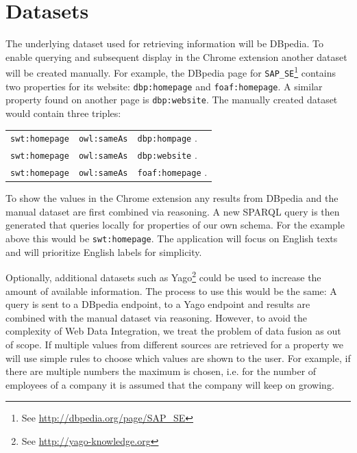 \documentclass[11pt,titlepage,oneside,openany]{article}
\begin{document}
\section{Datasets}
The underlying dataset used for retrieving information will be
DBpedia. To enable querying and
subsequent display in the Chrome extension another dataset will be created manually.
For example, the DBpedia page for 
\texttt{SAP\_SE}\footnote{See \url{http://dbpedia.org/page/SAP\_SE}} contains
two properties for its website: \texttt{dbp:homepage} and \texttt{foaf:homepage}.
A similar property found on another page is \texttt{dbp:website}. The manually
created dataset would contain three triples:
\begin{center}
\begin{tabular}{lll}
\texttt{swt:homepage} & \texttt{owl:sameAs} & \texttt{dbp:hompage} .   \\
\texttt{swt:homepage} & \texttt{owl:sameAs} & \texttt{dbp:website} .   \\
\texttt{swt:homepage} & \texttt{owl:sameAs} & \texttt{foaf:homepage} .
\end{tabular}
\end{center}

To show the values in the Chrome extension any results from DBpedia and the
manual dataset are first combined via reasoning. A new SPARQL query is then
generated that queries locally for properties of our own schema. For the example
above this would be \texttt{swt:homepage}. The application will focus on
English texts and will prioritize English labels for simplicity.

Optionally, additional datasets such as
Yago\footnote{See \url{http://yago-knowledge.org}} could be used to increase the
amount of available information. The process to use this would be the same: A query is sent to a DBpedia endpoint, to a Yago
endpoint and results are combined with the manual dataset via reasoning. 
However, to avoid the complexity of Web Data Integration, we treat the problem
of data fusion as out of scope. If multiple values from different sources are
retrieved for a property we will use simple rules to choose which values are
shown to the user. For example, if there are multiple numbers the maximum is
chosen, i.e. for the number of employees of a company it is assumed that the company will keep on growing.

\end{document}
